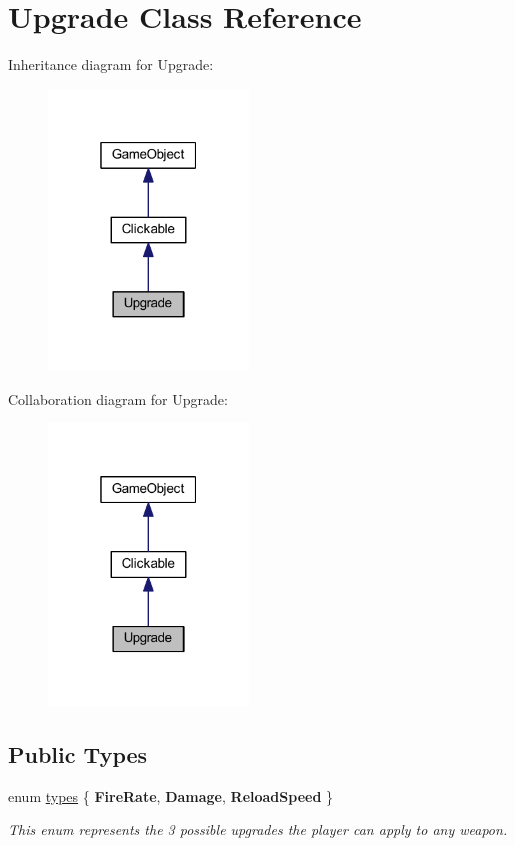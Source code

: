 \hypertarget{class_upgrade}{\section{Upgrade Class Reference}
\label{class_upgrade}
}


Inheritance diagram for Upgrade\+:\nopagebreak
\begin{figure}[H]
\begin{center}
\leavevmode
\includegraphics[width=151pt]{class_upgrade__inherit__graph}
\end{center}
\end{figure}


Collaboration diagram for Upgrade\+:\nopagebreak
\begin{figure}[H]
\begin{center}
\leavevmode
\includegraphics[width=151pt]{class_upgrade__coll__graph}
\end{center}
\end{figure}
\subsection*{Public Types}
\begin{DoxyCompactItemize}
\item 
\hypertarget{class_upgrade_a5834f56fecec704c0c9a25158bd09b0b}{enum \hyperlink{class_upgrade_a5834f56fecec704c0c9a25158bd09b0b}{types} \{ {\bfseries Fire\+Rate}, 
{\bfseries Damage}, 
{\bfseries Reload\+Speed}
 \}}\label{class_upgrade_a5834f56fecec704c0c9a25158bd09b0b}

\begin{DoxyCompactList}\small\item\em This enum represents the 3 possible upgrades the player can apply to any weapon. \end{DoxyCompactList}\end{DoxyCompactItemize}
